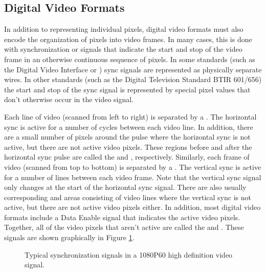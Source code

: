 \subsection{Digital Video Formats}
\label{sec:video:formats}

In addition to representing individual pixels, digital video formats must also encode the organization of pixels into video frames.  In many cases, this is done with synchronization or  signals that indicate the start and stop of the video frame in an otherwise continuous sequence of pixels.  In some standards (such as the Digital Video Interface or ) sync signals are represented as physically separate wires.  In other standards (such as the Digital Television Standard BTIR 601/656) the start and stop of the sync signal is represented by special pixel values that don't otherwise occur in the video signal.

Each line of video (scanned from left to right) is separated by a .  The horizontal sync is active for a number of cycles between each video line.  In addition, there are a small number of pixels around the pulse where the horizontal sync is not active, but there are not active video pixels.  These regions before and after the horizontal sync pulse are called the  and , respectively.  Similarly, each frame of video (scanned from top to bottom) is separated by a .  The vertical sync is active for a number of lines between each video frame.  Note that the vertical sync signal only changes at the start of the horizontal sync signal.  There are also usually corresponding  and  areas consisting of video lines where the vertical sync is not active, but there are not active video pixels either.  In addition, most digital video formats include a Data Enable signal that indicates the active video pixels.  Together, all of the video pixels that aren't active are called the 
 and .  These signals are shown graphically in Figure \ref{fig:video_syncs}.

\begin{figure}
\centering
{\tiny }
\caption{Typical synchronization signals in a 1080P60 high definition video signal.}\label{fig:video_syncs}
\end{figure}

